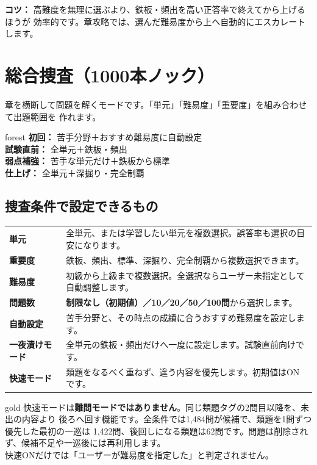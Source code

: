 \documentclass[11pt,a4paper]{ltjsarticle}
\begin{document}
\textbf{コツ：} 高難度を無理に選ぶより、鉄板・頻出を高い正答率で終えてから上げるほうが
効率的です。章攻略では、選んだ難易度から上へ自動的にエスカレートします。

\section*{総合捜査（1000本ノック）}

章を横断して問題を解くモードです。「単元」「難易度」「重要度」を組み合わせて出題範囲を
作れます。

\begin{casebox}[おすすめ設定]{forest}
\textbf{初回：} 苦手分野＋おすすめ難易度に自動設定\\
\textbf{試験直前：} 全単元＋鉄板・頻出\\
\textbf{弱点補強：} 苦手な単元だけ＋鉄板から標準\\
\textbf{仕上げ：} 全単元＋深掘り・完全制覇
\end{casebox}

\subsection*{捜査条件で設定できるもの}

\begin{tabularx}{\linewidth}{>{\bfseries}p{32mm}X}
単元 & 全単元、または学習したい単元を複数選択。誤答率も選択の目安になります。\\
重要度 & 鉄板、頻出、標準、深掘り、完全制覇から複数選択できます。\\
難易度 & 初級から上級まで複数選択。全選択ならユーザー未指定として自動調整します。\\
問題数 & \textbf{制限なし（初期値）／10／20／50／100問}から選択します。\\
自動設定 & 苦手分野と、その時点の成績に合うおすすめ難易度を設定します。\\
一夜漬けモード & 全単元の鉄板・頻出だけへ一度に設定します。試験直前向けです。\\
快速モード & 類題をなるべく重ねず、違う内容を優先します。初期値はONです。\\
\end{tabularx}

\begin{casebox}[快速モードの正確な動き]{gold}
快速モードは\textbf{難問モードではありません}。同じ類題タグの2問目以降を、未出の内容より
後ろへ回す機能です。全条件では1,484問が候補で、類題を1問ずつ優先した最初の一巡は
1,422問、後回しになる類題は62問です。問題は削除されず、候補不足や一巡後には再利用します。\\
快速ONだけでは「ユーザーが難易度を指定した」と判定されません。
\end{casebox}
\end{document}
